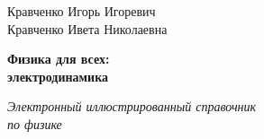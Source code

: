 \begin{titlepage}
    \begin{center}
        \vspace*{0.5cm}
        
        \Large
        Кравченко Игорь Игоревич\\
        Кравченко Ивета Николаевна
        
        \vspace{1cm}
        \Huge
        \textbf{Физика для всех:\\
        электродинамика}
        
        \vspace{1.5cm}
        
        \vfill
        \Large
        \textit{Электронный иллюстрированный справочник\\
        по физике}
        
        \vspace{15cm}

    \end{center}
\end{titlepage}